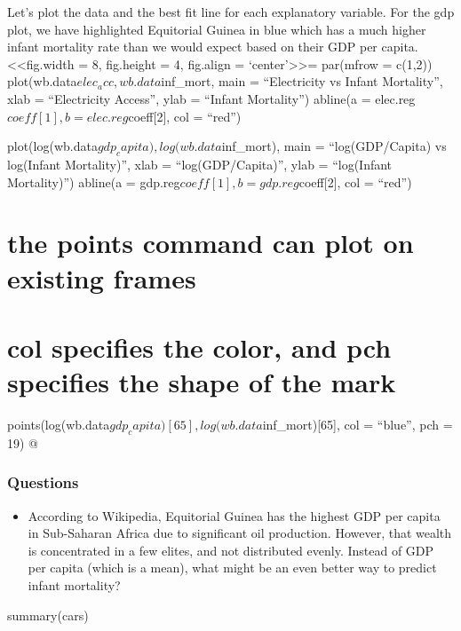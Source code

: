 \documentclass[
]{article}
\newenvironment{Shaded}{\begin{snugshade}}{\end{snugshade}}
\newcommand{\FunctionTok}[1]{\textcolor[rgb]{0.00,0.00,0.00}{#1}}
\newcommand{\NormalTok}[1]{#1}
\begin{document}
Let's plot the data and the best fit line for each explanatory variable.
For the gdp plot, we have highlighted Equitorial Guinea in blue which
has a much higher infant mortality rate than we would expect based on
their GDP per capita. \textless\textless fig.width = 8, fig.height = 4,
fig.align = `center'\textgreater\textgreater= par(mfrow = c(1,2))
plot(wb.data\(elec_acc, wb.data\)inf\_mort, main = ``Electricity vs
Infant Mortality'', xlab = ``Electricity Access'', ylab = ``Infant
Mortality'') abline(a = elec.reg\(coeff[1], b = elec.reg\)coeff{[}2{]},
col = ``red'')

plot(log(wb.data\(gdp_capita), log(wb.data\)inf\_mort), main =
``log(GDP/Capita) vs log(Infant Mortality)'', xlab =
``log(GDP/Capita)'', ylab = ``log(Infant Mortality)'') abline(a =
gdp.reg\(coeff[1], b = gdp.reg\)coeff{[}2{]}, col = ``red'')

\hypertarget{the-points-command-can-plot-on-existing-frames}{%
\section{the points command can plot on existing
frames}\label{the-points-command-can-plot-on-existing-frames}}

\hypertarget{col-specifies-the-color-and-pch-specifies-the-shape-of-the-mark}{%
\section{col specifies the color, and pch specifies the shape of the
mark}\label{col-specifies-the-color-and-pch-specifies-the-shape-of-the-mark}}

points(log(wb.data\(gdp_capita)[65], log(wb.data\)inf\_mort){[}65{]},
col = ``blue'', pch = 19) @

\subsubsection*{Questions}
\begin{itemize}
\item According to Wikipedia, Equitorial Guinea has the highest GDP per capita in Sub-Saharan Africa due to significant oil production. However, that wealth is concentrated in a few elites, and not distributed evenly. Instead of GDP per capita (which is a mean), what might be an even better way to predict infant mortality?
\end{itemize}

\begin{Shaded}
\begin{Highlighting}[]
\FunctionTok{summary}\NormalTok{(cars)}
\end{Highlighting}
\end{Shaded}
\end{document}
